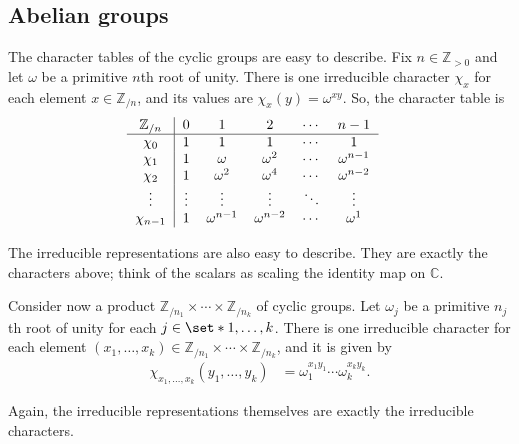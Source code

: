 \subsection{Abelian groups} %
\pan The character tables of the cyclic groups are easy to describe. Fix $n \in \mathbb{Z}_{> 0}$ and let $\omega$ be a primitive $n$th root of unity. There is one irreducible character $\chi_x$ for each element $x \in \mathbb{Z}_{/n}$, and its values are $\chi_x (y) = \omega^{x y}$. So, the character table is
\begin{align*}
  & \begin{tabular}{c|ccccc}
    $\mathbb{Z}_{/n}$ & $0$ & $1$ & $2$ & $\cdots$ & $n - 1$ \\
    \hline
    $\chi_{0}$ & $1$ & $1$ & $1$ & $\cdots$ & $1$ \\
    $\chi_{1}$ & $1$ & $\omega$ & $\omega^2$ & $\cdots$ & $\omega^{n - 1}$ \\
    $\chi_{2}$ & $1$ & $\omega^2$ & $\omega^4$ & $\cdots$ & $\omega^{n - 2}$ \\
    $\vdots$ & $\vdots$ & $\vdots$ & $\vdots$ & $\ddots$ & $\vdots$ \\
    $\chi_{n - 1}$ & $1$ & $\omega^{n - 1}$ & $\omega^{n - 2}$ & $\cdots$ & $\omega^1$ \\
  \end{tabular}
\end{align*}
\par The irreducible representations are also easy to describe. They are exactly the characters above; think of the scalars as scaling the identity map on $\mathbb{C}$.
\par Consider now a product $\mathbb{Z}_{/n_1} \times \cdots \times \mathbb{Z}_{/ n_k}$ of cyclic groups. Let $\omega_j$ be a primitive $n_j$th root of unity for each $j \in \set*{1, \dots, k}$. There is one irreducible character for each element $(x_1, \dots, x_k) \in \mathbb{Z}_{/ n_1} \times \cdots \times \mathbb{Z}_{/ n_k}$, and it is given by
\begin{align*}
  \chi_{x_1, \dots, x_k} (y_1, \dots, y_k)
  &= \omega_1^{x_1 y_1} \cdots \omega_k^{x_k y_k}
  .
\end{align*}
\par Again, the irreducible representations themselves are exactly the irreducible characters.

